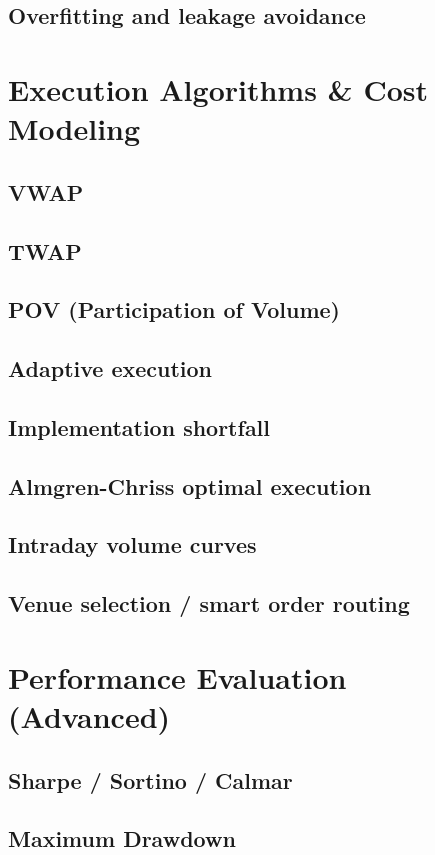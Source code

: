 \documentclass{report}
\begin{document}
\subsection*{Overfitting and leakage avoidance}

\section{Execution Algorithms \& Cost Modeling}
\subsection*{VWAP}
\subsection*{TWAP}
\subsection*{POV (Participation of Volume)}
\subsection*{Adaptive execution}
\subsection*{Implementation shortfall}
\subsection*{Almgren-Chriss optimal execution}
\subsection*{Intraday volume curves}
\subsection*{Venue selection / smart order routing}

\section{Performance Evaluation (Advanced)}
\subsection*{Sharpe / Sortino / Calmar}
\subsection*{Maximum Drawdown}
\end{document}
